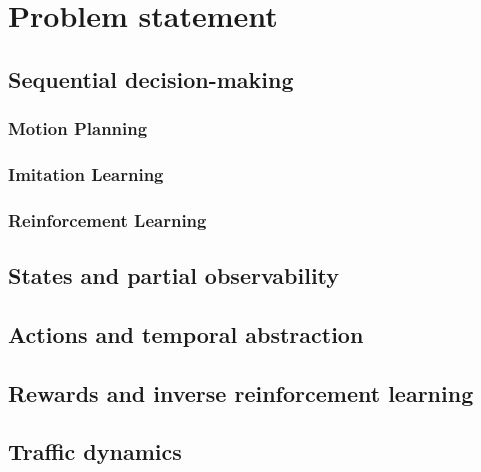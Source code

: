 
\chapter{Problem statement}
\label{chapter:2}

\section{Sequential decision-making}
\subsection*{Motion Planning}
\subsection*{Imitation Learning}
\subsection*{Reinforcement Learning}
\section{States and partial observability}
\section{Actions and temporal abstraction}
\section{Rewards and inverse reinforcement learning}
\section{Traffic dynamics}